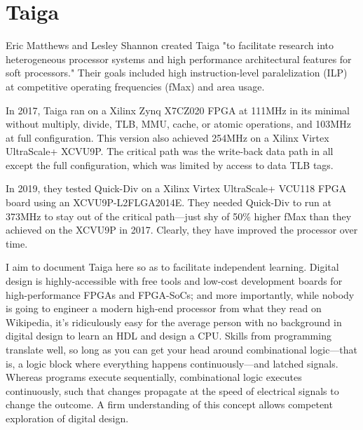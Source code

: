 \chapter{Taiga}

Eric Matthews and Lesley Shannon created Taiga "to facilitate research into heterogeneous processor systems and high performance architectural features for soft processors."  Their goals included high instruction-level paralelization (ILP) at competitive operating frequencies (fMax) and area usage.

In 2017, Taiga ran on a Xilinx Zynq X7CZ020 FPGA at 111MHz in its minimal without multiply, divide, TLB, MMU, cache, or atomic operations, and 103MHz at full configuration.  This version also achieved 254MHz on a Xilinx Virtex UltraScale+ XCVU9P.  The critical path was the write-back data path in all except the full configuration, which was limited by access to data TLB tags.

In 2019, they tested Quick-Div on a Xilinx Virtex UltraScale+ VCU118 FPGA board using an XCVU9P-L2FLGA2014E.  They needed Quick-Div to run at 373MHz to stay out of the critical path—just shy of 50\% higher fMax than they achieved on the XCVU9P in 2017.  Clearly, they have improved the processor over time.

I aim to document Taiga here so as to facilitate independent learning.  Digital design is highly-accessible with free tools and low-cost development boards for high-performance FPGAs and FPGA-SoCs; and more importantly, while nobody is going to engineer a modern high-end processor from what they read on Wikipedia, it's ridiculously easy for the average person with no background in digital design to learn an HDL and design a CPU.  Skills from programming translate well, so long as you can get your head around combinational logic—that is, a logic block where everything happens continuously—and latched signals.  Whereas programs execute sequentially, combinational logic executes continuously, such that changes propagate at the speed of electrical signals to change the outcome.  A firm understanding of this concept allows competent exploration of digital design.